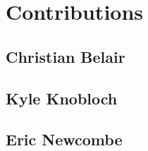 \section{Contributions}

\subsection{Christian Belair}


\subsection{Kyle Knobloch}


\subsection{Eric Newcombe}
